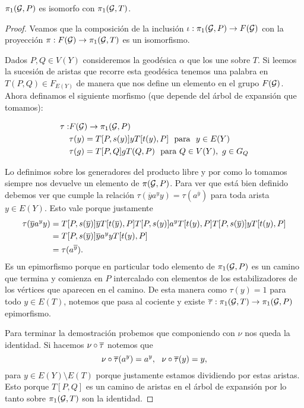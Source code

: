 \documentclass[tesis.tex]{subfiles}
\newcommand{\cG}{ {\cal G} }
\begin{document}
\begin{teo}\label{teo_grp_fund_iso}
	$\pi_1({\cal G}, P)$ es isomorfo con $\pi_1({\cal G}, T)$.
\end{teo}
\begin{proof}
	Veamos que la composición de la inclusión $\iota: \pi_1( \cG ,P)  \to F(\cG)$ con la proyección $\pi: F(\cG) \to \pi_1(\cG, T)$ es un isomorfismo.
	
	Dados $P,Q \in V(Y)$ consideremos la geodésica $\alpha$ que los une sobre $T$.
	Si leemos la sucesión de aristas que recorre esta geodésica tenemos una palabra en $T(P,Q) \in F_{E(Y)}$ de manera que nos define un elemento en el grupo $F(\cG)$.
	Ahora definamos el siguiente morfismo (que depende del árbol de expansión que tomamos):
	
	\begin{align*}
		\tau: & F(\cG) \to \pi_1(\cG,P)  \\
		& \tau(y) = T[P,s(y)]yT[t(y),P] \ \ \text{para } \ y\in E(Y) \\
		& \tau(g) = T[P,Q] g T(Q,P) \ \  \text{para} \ Q \in V(Y), \ g \in G_Q
	\end{align*}
	
	Lo definimos sobre los generadores del producto libre y por como lo tomamos siempre nos devuelve un elemento de $\pi(\cG, P)$.
	Para ver que está bien definido debemos ver que cumple la relación $\tau(\overline y a^y y) = \tau (a^{\overline y})$ para toda arista $y \in E(Y)$.
	Esto vale porque justamente 
	\begin{align*}
		\tau(\overline y a^y y) & = T[P,s(\overline y)]\overline yT[t(\overline y),P] T[P,s(y)] a^y T[t(y),P] T[P,s(\overline y)]yT[t( y),P] \\
		& = T[P,s(\overline y)]  \overline y a^y y T[t( y),P] \\
		& = \tau (a^{\overline y}).
	\end{align*}
	Es un epimorfismo porque en particular todo elemento de $\pi_1(\cG, P)$ es un camino que termina y comienza en $P$ intercalado con elementos de los estabilizadores de los vértices que aparecen en el camino.
	De esta manera como $\tau(y)=1$ para todo $y \in E(T)$, notemos que pasa al cociente y existe $\ol \tau: \pi_{1}(\cG, T) \to \pi_1 (\cG, P)$ epimorfismo.
	
	Para terminar la demostración probemos que componiendo con $\nu$ nos queda la identidad.
	Si hacemos $\nu \circ \overline \tau$ notemos que 
	\begin{equation*}
		\nu \circ \overline \tau (a^y) = a^y, \ \ \nu \circ \overline \tau (y) = y, 
	\end{equation*}
	para $y \in E(Y) \setminus E(T)$ porque justamente estamos dividiendo por estas aristas. 
	Esto porque $T[P,Q]$ es un camino de aristas en el árbol de expansión por lo tanto sobre $\pi_1(\cG, T)$ son la identidad.
\end{proof}
\end{document}
